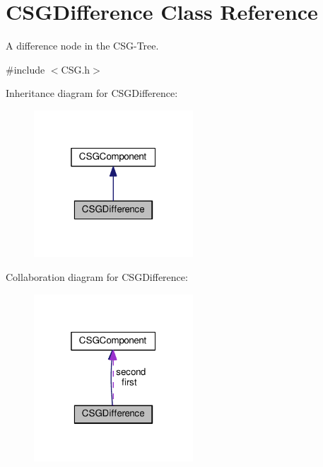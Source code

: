 \hypertarget{classCSGDifference}{}\section{C\+S\+G\+Difference Class Reference}
\label{classCSGDifference}


A difference node in the C\+S\+G-\/\+Tree.  




{\ttfamily \#include $<$C\+S\+G.\+h$>$}



Inheritance diagram for C\+S\+G\+Difference\+:\nopagebreak
\begin{figure}[H]
\begin{center}
\leavevmode
\includegraphics[width=169pt]{classCSGDifference__inherit__graph}
\end{center}
\end{figure}


Collaboration diagram for C\+S\+G\+Difference\+:\nopagebreak
\begin{figure}[H]
\begin{center}
\leavevmode
\includegraphics[width=169pt]{classCSGDifference__coll__graph}
\end{center}
\end{figure}
